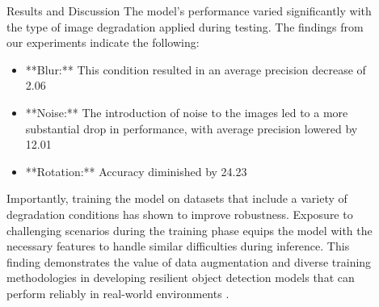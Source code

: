 \documentclass[final]{beamer}
\newlength{\sepwidth}
\newlength{\colwidth}
\newcommand{\separatorcolumn}{\begin{column}{\sepwidth}\end{column}}
\begin{document}
\begin{frame}[t]
\begin{columns}[t]
\begin{column}{\colwidth}
  
\end{column}

\separatorcolumn

\begin{column}{\colwidth}
    \begin{block}{Results and Discussion}
    The model’s performance varied significantly with the type of image degradation applied during testing. The findings from our experiments indicate the following:

    \begin{itemize}
      \item **Blur:** This condition resulted in an average precision decrease of 2.06%

      \item **Noise:** The introduction of noise to the images led to a more substantial drop in performance, with average precision lowered by 12.01%

      \item **Rotation:** Accuracy diminished by 24.23%
    \end{itemize}

    Importantly, training the model on datasets that include a variety of degradation conditions has shown to improve robustness. Exposure to challenging scenarios during the training phase equips the model with the necessary features to handle similar difficulties during inference. This finding demonstrates the value of data augmentation and diverse training methodologies in developing resilient object detection models that can perform reliably in real-world environments \cite{7}.
  \end{block}


\end{column}
\end{columns}
\end{frame}
\end{document}
